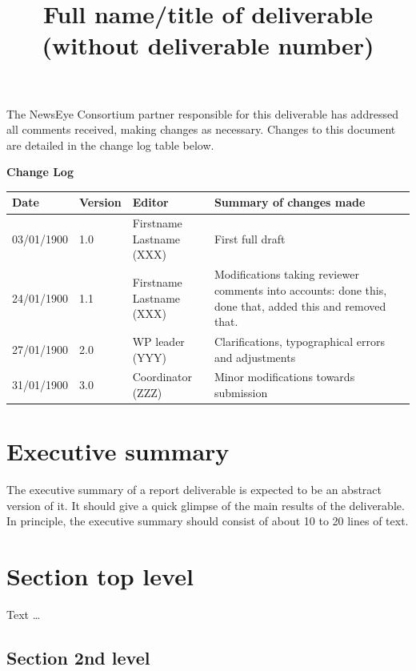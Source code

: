 \documentclass{newseye_del}
\title{Full name/title of deliverable (without deliverable number)}
\begin{document}
\titlepage

The NewsEye Consortium partner responsible for this deliverable has
addressed all comments received, making changes as necessary.
Changes to this document are detailed in the change log table below.

\textbf{Change Log}\\[5pt]
\begin{tabular}{ |p{2.1cm}|p{1.2cm}|p{3.8cm}|p{7.2cm}|  }
 \hline
 \rowcolor{lightgray} Date & Version & Editor & Summary of changes made\\
 \hline
 03/01/1900 & 1.0 & \makecell{Firstname Lastname \\ (XXX)} & First full draft\\
 \hline
 24/01/1900 & 1.1 & \makecell{Firstname Lastname \\ (XXX)} & Modifications taking reviewer comments into accounts: done this, done that, added this and removed that.\\
 \hline
 27/01/1900 & 2.0 & \makecell{WP leader \\ (YYY)} & Clarifications, typographical errors and adjustments\\
 \hline
 31/01/1900 & 3.0 & \makecell{Coordinator \\ (ZZZ)} & Minor modifications towards submission\\
 \hline
\end{tabular}



\newpage
\section*{Executive summary}

The executive summary of a report deliverable is expected to be an
abstract version of it. It should give a quick glimpse of the main
results of the deliverable. In principle, the executive summary
should consist of about 10 to 20 lines of text.

\tableofcontents
\newpage


\section{Section top level}

Text \dots

\subsection{Section 2nd level}
\label{sec:example subsection}
\end{document}
